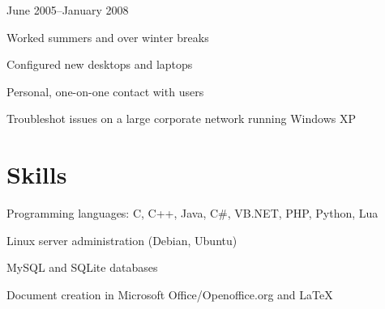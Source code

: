 \documentclass[11pt]{resume}
\begin{document}
	{June 2005--January 2008}
	\begin{compactitem}
	\item Worked summers and over winter breaks
	\item Configured new desktops and laptops
	\item Personal, one-on-one contact with users
	\item Troubleshot issues on a large corporate network running Windows XP
	\end{compactitem}

\section{Skills}
	\vspace{\secskip}
	\begin{compactitem}
	\item Programming languages: C, C++, Java, C\#, VB.NET, PHP, Python, Lua
	\item Linux server administration (Debian, Ubuntu)
	\item MySQL and SQLite databases
	\item Document creation in Microsoft Office/Openoffice.org and \LaTeX{}
	\end{compactitem}
\end{document}
